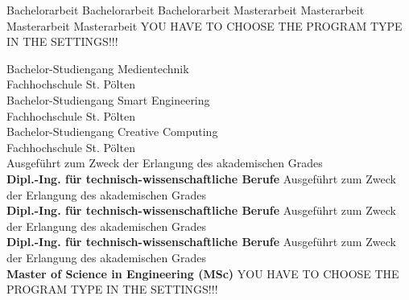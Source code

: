 \begin{center}

\vspace{1cm}

\begin{minipage}[t][5cm][s]{\textwidth}%
\centering
\Huge{{\color{FH2}{\fontsize{24}{30} \selectfont \workTitle\\}}}
\vspace{0.5cm}
\LARGE{{\color{FH2}{\fontsize{16}{24} \selectfont \subTitle\\}}}
\end{minipage}

\vspace{1cm}


\ifUseBachelorMediaTechnologies
	\LARGE{Bachelorarbeit}
\else
	\ifUseBachelorSmartEngineering
		\LARGE{Bachelorarbeit}
\else
	\ifUseBachelorCreativeComputing
		\LARGE{Bachelorarbeit}
\else
	\ifUseMasterInteractiveTechnologies
		\LARGE{Masterarbeit}
\else
	\ifUseMasterDigitalDesign
		\LARGE{Masterarbeit}
\else
    \ifUseMasterDigitalMediaProduction
		\LARGE{Masterarbeit}
\else
	\ifUseMasterDigitalHealthCare
		\LARGE{Masterarbeit}
    \else
        \LARGE{YOU HAVE TO CHOOSE THE PROGRAM TYPE IN THE SETTINGS!!!}
  	\fi
\fi
\fi
\fi\fi\fi\fi
  
\vspace{1.3cm}
\ifUseBachelorMediaTechnologies
		\fontsize{11pt}{15pt}\selectfont Bachelor-Studiengang Medientechnik\\
Fachhochschule St. Pölten\\  
\else
	\ifUseBachelorSmartEngineering
    	\fontsize{11pt}{15pt}\selectfont Bachelor-Studiengang Smart Engineering\\
Fachhochschule St. Pölten\\ 
\else
    \ifUseBachelorCreativeComputing
    	\fontsize{11pt}{15pt}\selectfont Bachelor-Studiengang Creative Computing\\
Fachhochschule St. Pölten\\ 
\else
	\ifUseMasterInteractiveTechnologies
		\fontsize{11pt}{15pt}\selectfont Ausgeführt zum Zweck der Erlangung des akademischen Grades\\
		\textbf{Dipl.-Ing. für technisch-wissenschaftliche Berufe}
\else
	\ifUseMasterDigitalDesign
		\fontsize{11pt}{15pt}\selectfont Ausgeführt zum Zweck der Erlangung des akademischen Grades\\
		\textbf{Dipl.-Ing. für technisch-wissenschaftliche Berufe}	
\else
    \ifUseMasterDigitalMediaProduction
		\fontsize{11pt}{15pt}\selectfont Ausgeführt zum Zweck der Erlangung des akademischen Grades\\
		\textbf{Dipl.-Ing. für technisch-wissenschaftliche Berufe}	
\else
	\ifUseMasterDigitalHealthCare
    	\fontsize{11pt}{15pt}\selectfont Ausgeführt zum Zweck der Erlangung des akademischen Grades\\
		\textbf{Master of Science in Engineering (MSc)}
    \else
        \LARGE{YOU HAVE TO CHOOSE THE PROGRAM TYPE IN THE SETTINGS!!!}
\fi\fi\fi\fi\fi\fi\fi


\end{center}
